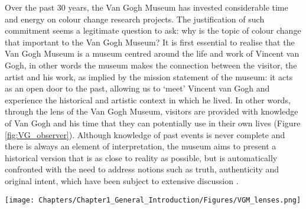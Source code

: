 Over the past 30 years, the Van Gogh Museum has invested considerable time and energy on colour change research projects. The justification of such commitment seems a legitimate question to ask: why is the topic of colour change that important to the Van Gogh Museum? It is first essential to realise that the Van Gogh Museum is a museum centred around the life and work of Vincent van Gogh, in other words the museum makes the connection between the visitor, the artist and his work, as implied by the mission statement of the  museum: it acts as an open door to the past, allowing us to ‘meet’ Vincent van Gogh and experience the historical and artistic context in which he lived. In other words, through the lens of the Van Gogh Museum, visitors are provided with knowledge of Van Gogh and his time that they can potentially use in their own lives (Figure \ref{fig:VG_observer}). Although knowledge of past events is never complete and there is always an element of interpretation, the museum aims to present a historical version that is as close to reality as possible, but is automatically confronted with the need to address notions such as truth, authenticity and original intent, which have been subject to extensive discussion \citep{munoz_vinas_ethics_2020,leveau_problemes_2009,price_historical_1996}.\\


\begin{figure*}
\centering
\texttt{[image: Chapters/Chapter1\_General\_Introduction/Figures/VGM\_lenses.png]}
\caption[\hspace{0.3cm}Relationship observer - Van Gogh]{Relationship between observer and Van Gogh through the lens of the Van Gogh Museum.}
\label{fig:VG_observer}
\end{figure*}

